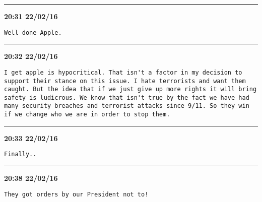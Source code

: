 \hrule%

\begin{adjustwidth}{0cm}{0cm}
\footnotesize \textbf{20:31 22/02/16}

\begin{lstlisting}[breaklines, breakatwhitespace, basicstyle=\small, frame=leftline]
Well done Apple.
\end{lstlisting}
\end{adjustwidth}

\hrule%

\begin{adjustwidth}{0cm}{0cm}
\footnotesize \textbf{20:32 22/02/16}

\begin{lstlisting}[breaklines, breakatwhitespace, basicstyle=\small, frame=leftline]
I get apple is hypocritical. That isn't a factor in my decision to support their stance on this issue. I hate terrorists and want them caught. But the idea that if we just give up more rights it will bring safety is ludicrous. We know that isn't true by the fact we have had many security breaches and terrorist attacks since 9/11. So they win if we change who we are in order to stop them.
\end{lstlisting}
\end{adjustwidth}

\hrule%

\begin{adjustwidth}{0cm}{0cm}
\footnotesize \textbf{20:33 22/02/16}

\begin{lstlisting}[breaklines, breakatwhitespace, basicstyle=\small, frame=leftline]
Finally..
\end{lstlisting}
\end{adjustwidth}

\hrule%

\begin{adjustwidth}{0cm}{0cm}
\footnotesize \textbf{20:38 22/02/16}

\begin{lstlisting}[breaklines, breakatwhitespace, basicstyle=\small, frame=leftline]
They got orders by our President not to!
\end{lstlisting}
\end{adjustwidth}


